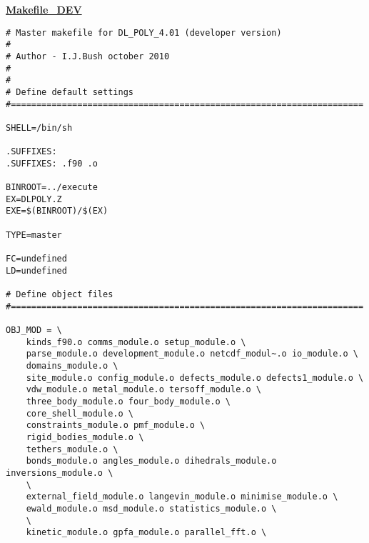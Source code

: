 \label{makefiles}
{\sc \bf \underline{Makefile\_DEV}}
\begin{verbatim}
# Master makefile for DL_POLY_4.01 (developer version)
#
# Author - I.J.Bush october 2010
#
#
# Define default settings
#=====================================================================

SHELL=/bin/sh

.SUFFIXES:
.SUFFIXES: .f90 .o

BINROOT=../execute
EX=DLPOLY.Z
EXE=$(BINROOT)/$(EX)

TYPE=master

FC=undefined
LD=undefined

# Define object files
#=====================================================================

OBJ_MOD = \
	kinds_f90.o comms_module.o setup_module.o \
	parse_module.o development_module.o netcdf_modul~.o io_module.o \
	domains_module.o \
	site_module.o config_module.o defects_module.o defects1_module.o \
	vdw_module.o metal_module.o tersoff_module.o \
	three_body_module.o four_body_module.o \
	core_shell_module.o \
	constraints_module.o pmf_module.o \
	rigid_bodies_module.o \
	tethers_module.o \
	bonds_module.o angles_module.o dihedrals_module.o inversions_module.o \
	\
	external_field_module.o langevin_module.o minimise_module.o \
	ewald_module.o msd_module.o statistics_module.o \
	\
	kinetic_module.o gpfa_module.o parallel_fft.o \


\end{verbatim}
